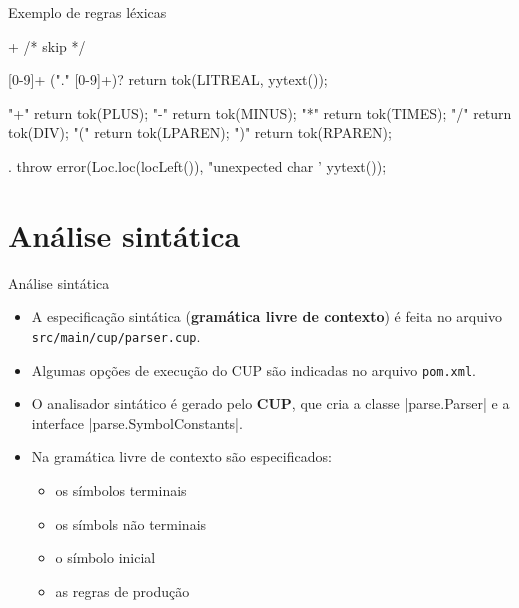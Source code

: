 \documentclass[smaller]{beamer}
\begin{document}
\begin{frame}{Exemplo de regras léxicas}
\begin{pygmented}[lang=text]
[ \t\f\n\r]+           { /* skip */ }

[0-9]+ ("." [0-9]+)?   { return tok(LITREAL, yytext()); }

"+"                    { return tok(PLUS); }
"-"                    { return tok(MINUS); }
"*"                    { return tok(TIMES); }
"/"                    { return tok(DIV); }
"("                    { return tok(LPAREN); }
")"                    { return tok(RPAREN); }

.                      { throw error(Loc.loc(locLeft()),
                                     "unexpected char '%
                                     yytext()); }
\end{pygmented}
\end{frame}


\section{Análise sintática}

\begin{frame}{Análise sintática}
  \begin{itemize}
    \item A especificação sintática (\textbf{gramática livre de
      contexto}) é feita no arquivo
    \alert{\texttt{src/main/cup/parser.cup}}.
    \item Algumas opções de execução do CUP são indicadas no arquivo
    \alert{\texttt{pom.xml}}.
    \item O analisador sintático é gerado pelo \textbf{CUP}, que cria
    a classe \pyginline|parse.Parser| e a interface
    \pyginline|parse.SymbolConstants|.
    \item Na gramática livre de contexto são especificados:
    \begin{itemize}
      \item os símbolos terminais
      \item os símbols não terminais
      \item o símbolo inicial
      \item as regras de produção
    \end{itemize}
  \end{itemize}
\end{frame}
\end{document}
